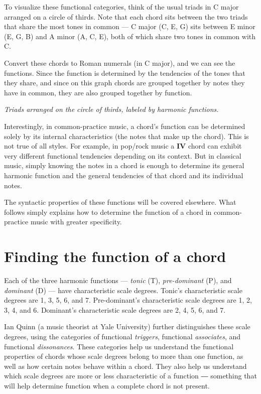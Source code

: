 \documentclass{book}
\begin{document}
To visualize these functional categories, think of the usual triads in C major
arranged on a circle of thirds. Note that each chord sits between the two
triads that share the most tones in common --- C major (C, E, G) sits between
E minor (E, G, B) and A minor (A, C, E), both of which share two tones in
common with C.

Convert these chords to Roman numerals (in C major), and we can see the
functions. Since the function is determined by the tendencies of the tones
that they share, and since on this graph chords are grouped together by notes
they have in common, they are also grouped together by function.

\emph{Triads arranged on the circle of thirds, labeled by harmonic functions.}

Interestingly, in common-practice music, a chord's function can be determined
solely by its internal characteristics (the notes that make up the chord).
This is not true of all styles. For example, in pop/rock music a \textbf{IV}
chord can exhibit very different functional tendencies depending on its
context. But in classical music, simply knowing the notes in a chord is enough
to determine its general harmonic function and the general tendencies of that
chord and its individual notes.

The syntactic properties of these functions will be covered elsewhere. What
follows simply explains how to determine the function of a chord in
common-practice music with greater specificity.

\hypertarget{finding-the-function-of-a-chord}{%
\section{Finding the function of a
chord}\label{finding-the-function-of-a-chord}}

Each of the three harmonic functions --- \emph{tonic} (T), \emph{pre-dominant}
(P), and \emph{dominant} (D) --- have characteristic scale degrees. Tonic's
characteristic scale degrees are 1, 3, 5, 6, and 7. Pre-dominant's
characteristic scale degrees are 1, 2, 3, 4, and 6. Dominant's characteristic
scale degrees are 2, 4, 5, 6, and 7.

Ian Quinn (a music theorist at Yale University) further distinguishes these
scale degrees, using the categories of functional \emph{triggers}, functional
\emph{associates}, and functional \emph{dissonances}. These categories help us
understand the functional properties of chords whose scale degrees belong to
more than one function, as well as how certain notes behave within a chord.
They also help us understand which scale degrees are more or less
characteristic of a function ― something that will help determine function
when a complete chord is not present.
\end{document}
